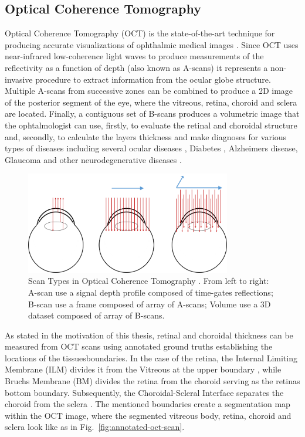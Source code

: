 \documentclass[12pt,a4paper]{scrartcl}
\begin{document}
\subsection{Optical Coherence Tomography}
Optical Coherence Tomography (OCT) is the state-of-the-art technique for producing accurate visualizations of ophthalmic medical images \cite{Garrido2014}. Since OCT uses near-infrared low-coherence light waves to produce measurements of the reflectivity as a function of depth (also known as A-scans\cite{Garrido2014}) it represents a non-invasive procedure to extract information from the ocular globe structure. Multiple A-scans from successive zones can be combined to produce a 2D image of the posterior segment of the eye, where the vitreous, retina, choroid and sclera are located. Finally, a contiguous set of B-scans produces a volumetric image that the ophtalmologist can use, firstly, to  evaluate the retinal and choroidal structure and, secondly, to calculate the layers thickness and make diagnoses for various types of diseases including several ocular diseases \cite{Ronchetti2019}, Diabetes \cite{Jiang2018}, Alzheimer\textquotesingle s disease, Glaucoma and other neurodegenerative diseases \cite{DENHAAN2017162}.   


\begin{figure}[H]
    \centering
    \includegraphics[width=0.8\textwidth]{./images/csm_ABC_scans.png}
    \caption{Scan Types in Optical Coherence Tomography \cite{Willdeman2016}. From left to right: A-scan use a signal depth profile composed of time-gates reflections; B-scan use a frame composed of array of A-scans; Volume use a 3D dataset composed of array of B-scans.}
    \label{fig:mb-oct-abcscans}
\end{figure}

As stated in the motivation of this thesis, retinal and choroidal thickness can be measured from OCT scans using annotated ground truths establishing the locations of the tissues\textquotesingle boundaries. In the case of the retina, the Internal Limiting Membrane (ILM) divides it from the Vitreous at the upper boundary \cite{MACNAIR2015343}, while Bruch\textquotesingle s Membrane (BM) divides the retina from the choroid \cite{BOOIJ20101} serving as the retina\textquotesingle s bottom boundary. Subsequently, the Choroidal-Scleral Interface separates the choroid from the sclera \cite{Ronchetti2018}. The mentioned boundaries create a segmentation map within the OCT image, where the segmented vitreous body, retina, choroid and sclera look like as in Fig.~\ref{fig:annotated-oct-scan}. 
\end{document}
